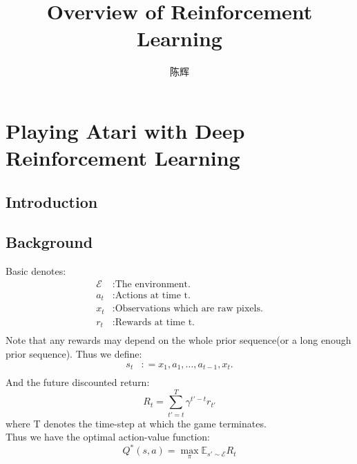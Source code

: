 \documentclass{article}
\title{Overview of Reinforcement Learning}
\author{陈辉}
\date{}
\numberwithin{equation}{subsection}
\newcommand{\citeinclude}[1]{}
\begin{document}
\maketitle
\tableofcontents
\newpage

\section{Playing Atari with Deep Reinforcement Learning}
\subsection{Introduction}
\subsection{Background}
Basic denotes:
\begin{align*}
    \mathcal{E} &: \text{The environment.}\\
    a_t &: \text{Actions at time t.}\\ 
    x_t &: \text{Observations which are raw pixels.}\\
    r_t &: \text{Rewards at time t.}\\
\end{align*}
Note that any rewards may depend on the whole prior sequence(or a long enough prior sequence). Thus we define:
\begin{align*}
        s_t &: = {x_1,a_1,\dots,a_{t-1},x_t}.\\
\end{align*}
And the future discounted return:
\begin{equation*}
        R_t = \sum_{t'=t}^T \gamma^{t'-t} r_{t'}
\end{equation*}
where T denotes the time-step at which the game terminates.\\
Thus we have the optimal action-value function:
\begin{equation*}
        Q^*(s,a)= \max_{\pi} \mathds{E}_{s'\sim\mathcal{E}}R_t
\end{equation*}








\citeinclude{Playing_Atari_with_Deep_Reinforcement_Learning}
\citeinclude{Asynchronous_Methods_for_Deep_Reinforcement_Learning}
\end{document}
